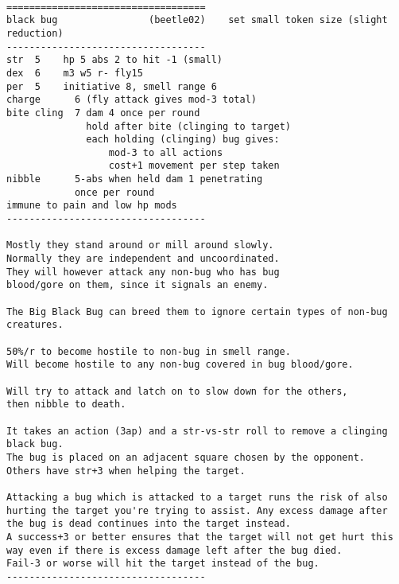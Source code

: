 \

\goodbreak \begin{samepage} \small \begin{verbatim}
===================================
black bug                (beetle02)    set small token size (slight reduction)
-----------------------------------
str  5    hp 5 abs 2 to hit -1 (small)
dex  6    m3 w5 r- fly15
per  5    initiative 8, smell range 6
charge      6 (fly attack gives mod-3 total)
bite cling  7 dam 4 once per round
              hold after bite (clinging to target)
              each holding (clinging) bug gives:
                  mod-3 to all actions
                  cost+1 movement per step taken
nibble      5-abs when held dam 1 penetrating
            once per round
immune to pain and low hp mods
-----------------------------------

Mostly they stand around or mill around slowly.
Normally they are independent and uncoordinated.
They will however attack any non-bug who has bug
blood/gore on them, since it signals an enemy.

The Big Black Bug can breed them to ignore certain types of non-bug creatures.

50%/r to become hostile to non-bug in smell range.
Will become hostile to any non-bug covered in bug blood/gore.

Will try to attack and latch on to slow down for the others,
then nibble to death.

It takes an action (3ap) and a str-vs-str roll to remove a clinging black bug.
The bug is placed on an adjacent square chosen by the opponent.
Others have str+3 when helping the target.

Attacking a bug which is attacked to a target runs the risk of also
hurting the target you're trying to assist. Any excess damage after
the bug is dead continues into the target instead.
A success+3 or better ensures that the target will not get hurt this
way even if there is excess damage left after the bug died.
Fail-3 or worse will hit the target instead of the bug.
-----------------------------------
\end{verbatim} \normalsize \end{samepage}

\

